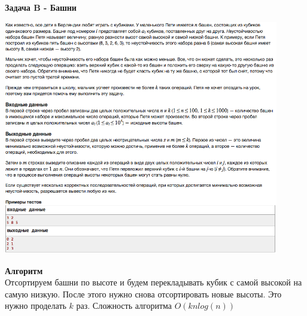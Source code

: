\documentclass[a4paper,12pt]{article}
\begin{document}
\newpage
\textbf{{\large Задача B - Башни}} \\
\begin{center}
\includegraphics[width=0.9\textwidth]{C_274/C_274_B.png}\\ [1cm]
\end{center}
\textbf{{\large Алгоритм}} \\
Отсортируем башни по высоте и будем перекладывать кубик с самой высокой на самую низкую. После этого нужно снова отсортировать новые высоты. Это нужно проделать $k$ раз. Сложность алгоритма $O(knlog(n))$\\
\end{document}
